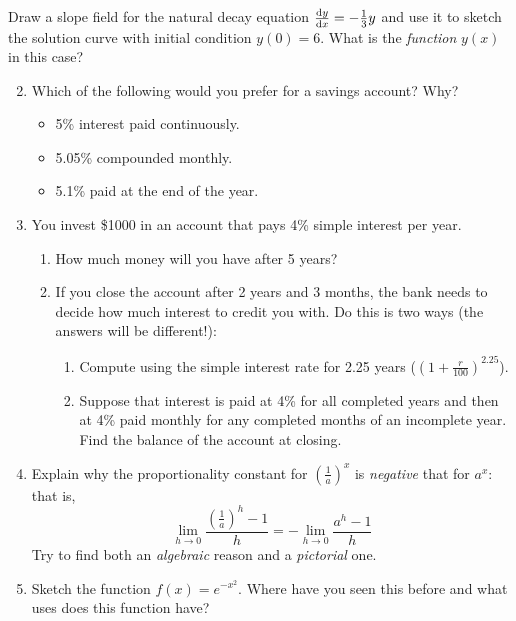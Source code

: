 \begin{exercises}{}{}
	\exstart Draw a slope field for the natural decay equation $\diff[y]{x}=-\frac 13y$ and use it to sketch the solution curve with initial condition $y(0)=6$. What is the \emph{function} $y(x)$ in this case?
	
	\begin{enumerate}\setcounter{enumi}{1}
	  \item Which of the following would you prefer for a savings account? Why?
		\begin{itemize}
	  	\item 5\% interest paid continuously. %
	  	\item 5.05\% compounded monthly. %
	  	\item 5.1\% paid at the end of the year. 
		\end{itemize}
		
	   
	  \item You invest \$1000 in an account that pays 4\% simple interest per year.
	  \begin{enumerate}
	    \item How much money will you have after 5 years?
	    \item If you close the account after 2 years and 3 months, the bank needs to decide how much interest to credit you with. Do this is two ways (the answers will be different!):
	    \begin{enumerate}
	      \item Compute using the simple interest rate for 2.25 years ($(1+\frac r{100})^{2.25}$).
	      \item Suppose that interest is paid at 4\% for all completed years and then at 4\% paid monthly for any completed months of an incomplete year. Find the balance of the account at closing.
	    \end{enumerate}
		\end{enumerate}

	
	  \item Explain why the proportionality constant for $\left(\frac 1a\right)^x$ is \emph{negative} that for $a^x$: that is,
	  \[
	  	\lim_{h\to 0}\frac{(\frac 1a)^h-1}h=-\lim_{h\to 0}\frac{a^h-1}h
	  \]
	  Try to find both an \emph{algebraic} reason and a \emph{pictorial} one.
	  
	  
	  \item Sketch the function $f(x)=e^{-x^2}$. Where have you seen this before and what uses does this function have?
	\end{enumerate}

\end{exercises}


